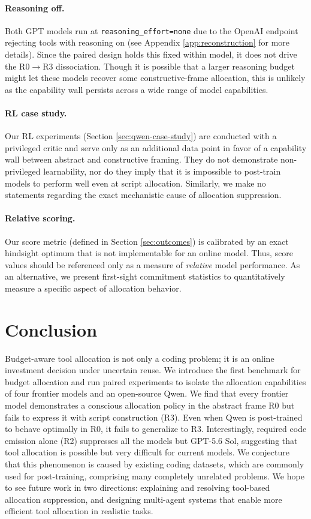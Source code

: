 \documentclass{article}
\begin{document}
\paragraph{Reasoning off.} Both GPT models run at \texttt{reasoning\_effort=none} due to the OpenAI endpoint rejecting tools with reasoning on (see Appendix \ref{app:reconstruction} for more details). Since the paired design holds this fixed within model, it does not drive the R0$\to$R3 dissociation. Though it is possible that a larger reasoning budget might let these models recover some constructive-frame allocation, this is unlikely as the capability wall persists across a wide range of model capabilities.

\paragraph{RL case study.} Our RL experiments (Section \ref{sec:qwen-case-study}) are conducted with a privileged critic and serve only as an additional data point in favor of a capability wall between abstract and constructive framing. They do not demonstrate non-privileged
learnability, nor do they imply that it is impossible to post-train models to perform well even at script allocation. Similarly, we make no statements regarding the exact mechanistic cause of allocation suppression.

\paragraph{Relative scoring.} Our score metric (defined in Section \ref{sec:outcomes}) is calibrated by an exact hindsight optimum that is not implementable for an online model. Thus, score values should be referenced only as a measure of \textit{relative} model performance. As an alternative, we present first-sight commitment statistics to quantitatively measure a specific aspect of allocation behavior.

\section{Conclusion}

Budget-aware tool allocation is not only a coding problem; it is an online investment
decision under uncertain reuse. We introduce the first benchmark for budget allocation and run paired experiments to isolate the allocation capabilities of four frontier models and an open-source Qwen. We find that every frontier model demonstrates a conscious allocation policy in the abstract
frame R0 but fails to express it with script construction (R3). Even when Qwen is post-trained to behave optimally in R0, it fails to generalize to R3. Interestingly, required code emission alone (R2) suppresses all the models but GPT-5.6 Sol, suggesting that tool allocation is possible but very difficult for current models. We conjecture that this phenomenon is caused by existing coding datasets, which are commonly used for post-training, comprising many completely unrelated problems. We hope to see future work in two directions: explaining and resolving tool-based allocation suppression, and designing multi-agent systems that enable more efficient tool allocation in realistic tasks.
\end{document}
